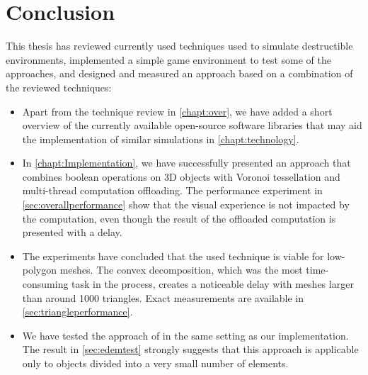 \chapter*{Conclusion}

This thesis has reviewed currently used techniques used to simulate destructible environments, implemented a simple game environment to test some of the approaches, and designed and measured an approach based on a combination of the reviewed techniques:

\begin{itemize}
\item Apart from the technique review in \cref{chapt:over}, we have added a short overview of the currently available open-source software libraries that may aid the implementation of similar simulations in \cref{chapt:technology}.

\item In \cref{chapt:Implementation}, we have successfully presented an approach that combines boolean operations on 3D objects with Voronoi tessellation and multi-thread computation offloading. The performance experiment in \cref{sec:overallperformance} show that the visual experience is not impacted by the computation, even though the result of the offloaded computation is presented with a delay.

\item The experiments have concluded that the used technique is viable for low-polygon meshes. The convex decomposition, which was the most time-consuming task in the process, creates a noticeable delay with meshes larger than around 1000 triangles. Exact measurements are available in \cref{sec:triangleperformance}.

\item We have tested the approach of \citet{edem} in the same setting as our implementation. The result in \cref{sec:edemtest} strongly suggests that this approach is applicable only to objects divided into a very small number of elements.
\end{itemize}

